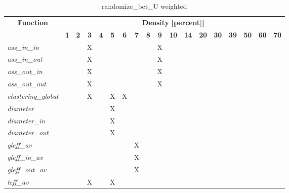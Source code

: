 \begin{table}[h] \centering \begin{tabular}{|l|c|c|c|c|c|c|c|c|c|c|c|c|c|c|c|c|c|} \hline\multicolumn{1}{|c|}{\textbf{\large{Function}}} & \multicolumn{17}{c|}{\large{\textbf{Density [percent]]}}}\\\cline{2-18}  & \textbf{1} &  \textbf{2} &  \textbf{3} &  \textbf{4} &  \textbf{5} &  \textbf{6} &  \textbf{7} &  \textbf{8} &  \textbf{9} &  \textbf{10} &  \textbf{14} &  \textbf{20} &  \textbf{30} &  \textbf{39} &  \textbf{50} &  \textbf{60} &  \textbf{70} \\ \hline   \textit{ass\_in\_in} &   &   & X &   &   &   &   &   & X &   &   &   &   &   &   &   &   \\ \hline  \textit{ass\_in\_out} &   &   & X &   &   &   &   &   & X &   &   &   &   &   &   &   &   \\ \hline  \textit{ass\_out\_in} &   &   & X &   &   &   &   &   & X &   &   &   &   &   &   &   &   \\ \hline  \textit{ass\_out\_out} &   &   & X &   &   &   &   &   & X &   &   &   &   &   &   &   &   \\ \hline  \textit{clustering\_global} &   &   & X &   & X & X &   &   &   &   &   &   &   &   &   &   &   \\ \hline  \textit{diameter} &   &   &   &   & X &   &   &   &   &   &   &   &   &   &   &   &   \\ \hline  \textit{diameter\_in} &   &   &   &   & X &   &   &   &   &   &   &   &   &   &   &   &   \\ \hline  \textit{diameter\_out} &   &   &   &   & X &   &   &   &   &   &   &   &   &   &   &   &   \\ \hline  \textit{gleff\_av} &   &   &   &   &   &   & X &   &   &   &   &   &   &   &   &   &   \\ \hline  \textit{gleff\_in\_av} &   &   &   &   &   &   & X &   &   &   &   &   &   &   &   &   &   \\ \hline  \textit{gleff\_out\_av} &   &   &   &   &   &   & X &   &   &   &   &   &   &   &   &   &   \\ \hline  \textit{leff\_av} &   &   & X &   & X &   &   &   &   &   &   &   &   &   &   &   &   \\ \hline \end{tabular}\caption{randomize\_bct\_U weighted}\label{tab:my_label} \end{table}